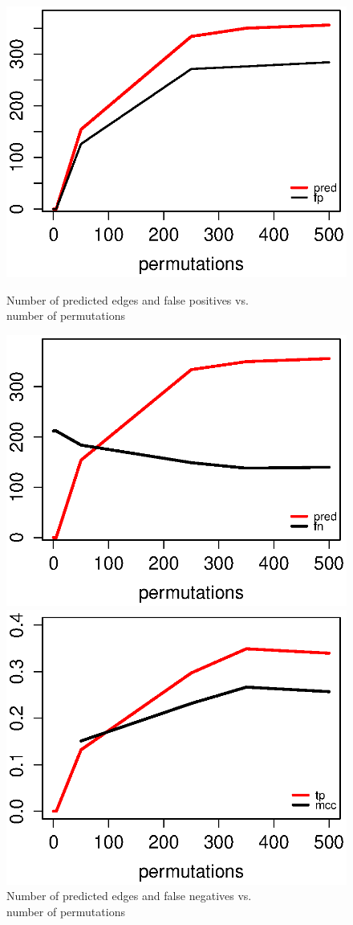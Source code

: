 \begin{figure} 
\noindent\begin{minipage}{.55\textwidth}
  \centering
  \includegraphics[width=.8\linewidth]{pred_fp.eps}
  \caption{Number of predicted edges and false positives vs. \\ number of permutations}
  \label{fig:pred_fp}
\end{minipage}%
\noindent\begin{minipage}{.55\textwidth}
  \centering
  \includegraphics[width=.8\linewidth]{pred_fn.eps}
  \caption{Number of predicted edges and false negatives vs. \\ number of permutations}
  \label{fig:pred_fn}
\end{minipage}
\begin{minipage}{.55\textwidth}
  \centering
  \includegraphics[width=.8\linewidth]{tp_mcc.eps}

\end{minipage}
\end{figure}
